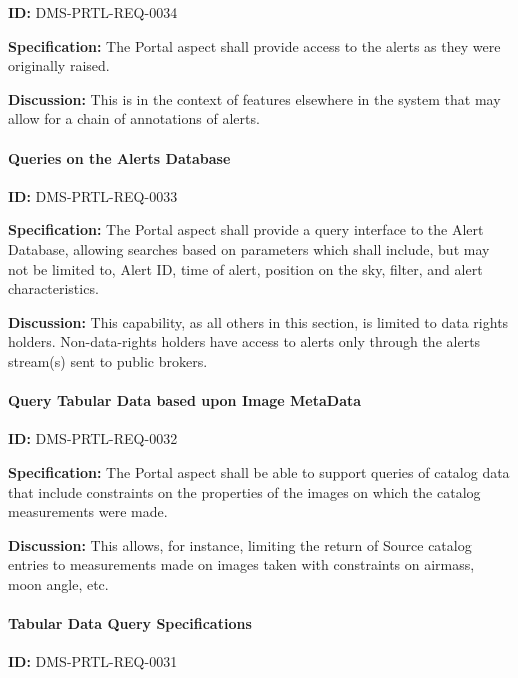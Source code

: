 \documentclass[SE,toc,lsstdraft]{lsstdoc}
\begin{document}
\label{DMS-PRTL-REQ-0034}
\textbf{ID:} DMS-PRTL-REQ-0034

\textbf{Specification:}
The Portal aspect shall provide access to the alerts as they were originally raised.

\textbf{Discussion:}
This is in the context of features elsewhere in the system that may allow for a chain of annotations of alerts.

\paragraph{Queries on the Alerts Database}\hfill  %

\label{DMS-PRTL-REQ-0033}
\textbf{ID:} DMS-PRTL-REQ-0033

\textbf{Specification:}
The Portal aspect shall provide a query interface to the Alert Database, allowing searches based on parameters which shall include, but may not be limited to, Alert ID, time of alert, position on the sky, filter, and alert characteristics.

\textbf{Discussion:}
This capability, as all others in this section, is limited to data rights holders.  Non-data-rights holders have access to alerts only through the alerts stream(s) sent to public brokers.

\paragraph{Query Tabular Data based upon Image MetaData}\hfill  %

\label{DMS-PRTL-REQ-0032}
\textbf{ID:} DMS-PRTL-REQ-0032

\textbf{Specification:}
The Portal aspect shall be able to support queries of catalog data that include constraints on the properties of the images on which the catalog measurements were made.

\textbf{Discussion:}
This allows, for instance, limiting the return of Source catalog entries to measurements made on images taken with constraints on airmass, moon angle, etc.

\paragraph{Tabular Data Query Specifications}\hfill  %

\label{DMS-PRTL-REQ-0031}
\textbf{ID:} DMS-PRTL-REQ-0031
\end{document}
